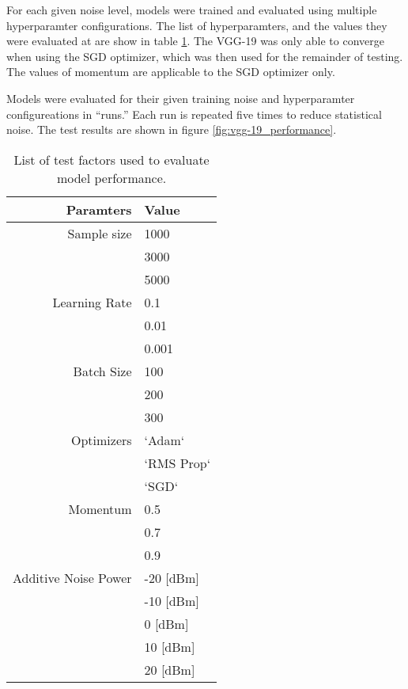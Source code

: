		For each given noise level, models were trained and evaluated using multiple hyperparamter configurations. The list of hyperparamters, and the values they were evaluated at are show in table \ref{tab:test_factors_vgg}. The VGG-19 was only able to converge when using the SGD optimizer, which was then used for the remainder of testing. The values of momentum are applicable to the SGD optimizer only.

		Models were evaluated for their given training noise and hyperparamter configureations in ``runs.'' Each run is repeated five times to reduce statistical noise. The test results are shown in figure \ref{fig:vgg-19_performance}.

		\begin{table}[htbp!]
			\begin{center}
				\caption[Hyperparameter test factors]{List of test factors used to evaluate model performance.}
				\label{tab:test_factors_vgg}
				\begin{tabular}{|r|l|}
					\hline
					\textbf{Paramters} & \textbf{Value}\\
					\hline
					Sample size	&	1000 \\
											& 3000 \\
											& 5000 \\
					\hline
					Learning Rate	& 0.1 \\
												& 0.01 \\
												& 0.001 \\
					\hline
					Batch Size	&	100 \\
											& 200 \\
											& 300 \\
					\hline
					Optimizers	& `Adam` \\
											& `RMS Prop`\\
											& `SGD` \\
					\hline
					Momentum 	& 0.5 \\
										& 0.7 \\
										& 0.9 \\
					\hline
					Additive Noise Power 	& -20 [dBm] \\
										& -10 [dBm] \\
										& 0 [dBm] \\
										& 10 [dBm] \\
										& 20 [dBm] \\
					\hline
				\end{tabular}
			\end{center}
		\end{table}


